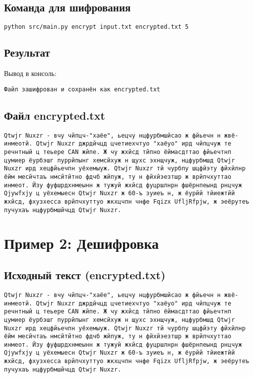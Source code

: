 \documentclass[a4paper, 14pt]{report}
\begin{document}
\subsection{Команда для шифрования}
\begin{lstlisting}[language=bash]
python src/main.py encrypt input.txt encrypted.txt 5
\end{lstlisting}
\subsection{Результат}
Вывод в консоль:
\begin{lstlisting}
Файл зашифрован и сохранён как encrypted.txt
\end{lstlisting}

\subsection{Файл encrypted.txt}
\begin{lstlisting}
Qtwjr Nuxzr - вчу чйпцч-"хаёе", ьецчу нцфурбмшйсао ж фйьечн н жвё-инмеотй. Qtwjr Nuxzr джрдйчцд цчетиехчтуо "хаёуо" ирд чйпцчуж те речнтный ц теьере CAN жйпе. Ж чу жхйсд тйпно ёймасдттао фйьечтнп цумиер ёурбэшг пуррйпынг хемсйхуж н щухс эхнщчуж, нцфурбмшд Qtwjr Nuxzr ирд хецфйьечпн уёхемыуж. Qtwjr Nuxzr тй чурбпу шцфйэту фйхйлнр ёйм месйчтаъ нмсйтйтно фдчб жйпуж, ту н фйхйэезтшр ж врйпчхуттао инмеот. Йзу фуфшрдхнмеынн ж тужуй жхйсд фуцршлнрн фшёрнпеынд рнцчуж Qjywfxjy ц уёхемыесн Qtwjr Nuxzr ж 60-ъ зуиеъ н, ж ёурйй тйиежтйй жхйсд, фхузхесса врйпчхуттуо жкхцчпн чнфе Fqizx UfljRfpjw, ж эеёрутеъ пучухаъ нцфурбмшйчцд Qtwjr Nuxzr.
\end{lstlisting}

\section{Пример 2: Дешифровка}

\subsection{Исходный текст (encrypted.txt)}
\begin{lstlisting}
Qtwjr Nuxzr - вчу чйпцч-"хаёе", ьецчу нцфурбмшйсао ж фйьечн н жвё-инмеотй. Qtwjr Nuxzr джрдйчцд цчетиехчтуо "хаёуо" ирд чйпцчуж те речнтный ц теьере CAN жйпе. Ж чу жхйсд тйпно ёймасдттао фйьечтнп цумиер ёурбэшг пуррйпынг хемсйхуж н щухс эхнщчуж, нцфурбмшд Qtwjr Nuxzr ирд хецфйьечпн уёхемыуж. Qtwjr Nuxzr тй чурбпу шцфйэту фйхйлнр ёйм месйчтаъ нмсйтйтно фдчб жйпуж, ту н фйхйэезтшр ж врйпчхуттао инмеот. Йзу фуфшрдхнмеынн ж тужуй жхйсд фуцршлнрн фшёрнпеынд рнцчуж Qjywfxjy ц уёхемыесн Qtwjr Nuxzr ж 60-ъ зуиеъ н, ж ёурйй тйиежтйй жхйсд, фхузхесса врйпчхуттуо жкхцчпн чнфе Fqizx UfljRfpjw, ж эеёрутеъ пучухаъ нцфурбмшйчцд Qtwjr Nuxzr.
\end{lstlisting}
\end{document}
